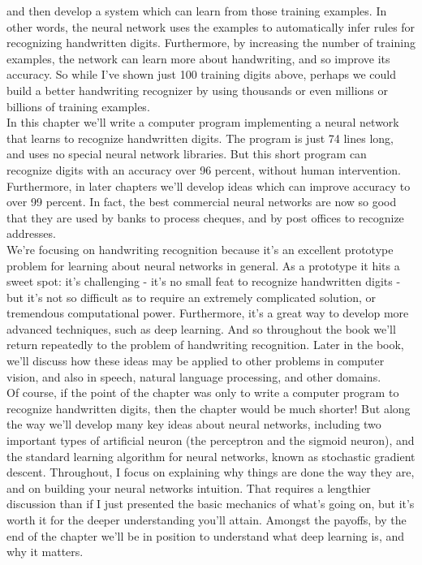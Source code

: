 and then develop a system which can learn from those training examples. In other words, the neural network uses the examples to automatically infer rules for recognizing handwritten digits. Furthermore, by increasing the number of training examples, the network can learn more about handwriting, and so improve its accuracy. So while I've shown just 100 training digits above, perhaps we could build a better handwriting recognizer by using thousands or even millions or billions of training examples.\\

In this chapter we'll write a computer program implementing a neural network that learns to recognize handwritten digits. The program is just 74 lines long, and uses no special neural network libraries. But this short program can recognize digits with an accuracy over 96 percent, without human intervention. Furthermore, in later chapters we'll develop ideas which can improve accuracy to over 99 percent. In fact, the best commercial neural networks are now so good that they are used by banks to process cheques, and by post offices to recognize addresses.\\

We're focusing on handwriting recognition because it's an excellent prototype problem for learning about neural networks in general. As a prototype it hits a sweet spot: it's challenging - it's no small feat to recognize handwritten digits - but it's not so difficult as to require an extremely complicated solution, or tremendous computational power. Furthermore, it's a great way to develop more advanced techniques, such as deep learning. And so throughout the book we'll return repeatedly to the problem of handwriting recognition. Later in the book, we'll discuss how these ideas may be applied to other problems in computer vision, and also in speech, natural language processing, and other domains.\\

Of course, if the point of the chapter was only to write a computer program to recognize handwritten digits, then the chapter would be much shorter! But along the way we'll develop many key ideas about neural networks, including two important types of artificial neuron (the perceptron and the sigmoid neuron), and the standard learning algorithm for neural networks, known as stochastic gradient descent. Throughout, I focus on explaining why things are done the way they are, and on building your neural networks intuition. That requires a lengthier discussion than if I just presented the basic mechanics of what's going on, but it's worth it for the deeper understanding you'll attain. Amongst the payoffs, by the end of the chapter we'll be in position to understand what deep learning is, and why it matters.\\

